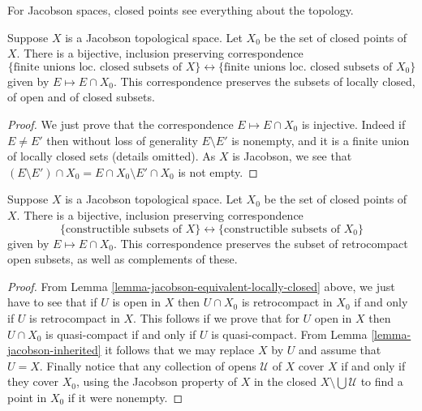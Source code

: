 \begin{lemma}
\label{lemma-jacobson-equivalent-locally-closed}
\begin{slogan}
For Jacobson spaces, closed points see everything about the topology.
\end{slogan}
Suppose $X$ is a Jacobson topological space.
Let $X_0$ be the set of closed points of $X$.
There is a bijective, inclusion preserving correspondence
$$
\{\text{finite unions loc.\ closed subsets of } X\}
\leftrightarrow
\{\text{finite unions loc.\ closed subsets of } X_0\}
$$
given by $E \mapsto E \cap X_0$. This correspondence preserves
the subsets of locally closed, of open and of closed subsets.
\end{lemma}

\begin{proof}
We just prove that the correspondence $E \mapsto E \cap X_0$ is injective.
Indeed if $E\neq E'$ then without loss of generality $E\setminus E'$ is
nonempty, and it is a finite union of locally closed sets (details omitted).
As $X$ is Jacobson, we see that
$(E \setminus E') \cap X_0 = E \cap X_0 \setminus E' \cap X_0$ is not empty.
\end{proof}

\begin{lemma}
\label{lemma-jacobson-equivalent-constructible}
Suppose $X$ is a Jacobson topological space.
Let $X_0$ be the set of closed points of $X$.
There is a bijective, inclusion preserving correspondence
$$
\{\text{constructible subsets of } X\}
\leftrightarrow
\{\text{constructible subsets of } X_0\}
$$
given by $E \mapsto E \cap X_0$. This correspondence preserves
the subset of retrocompact open subsets, as well as complements
of these.
\end{lemma}

\begin{proof}
From  Lemma \ref{lemma-jacobson-equivalent-locally-closed} above,
we just have to see that if $U$ is open in $X$ then $U\cap X_0$ is
retrocompact in $X_0$ if and only if $U$ is retrocompact in $X$.
This follows if we prove that for $U$ open in $X$ then $U\cap X_0$ is
quasi-compact if and only if $U$ is quasi-compact.
From  Lemma \ref{lemma-jacobson-inherited} it follows that we may replace
$X$ by $U$ and assume that $U = X$.
Finally notice that any collection of opens $\mathcal{U}$ of $X$ cover
$X$ if and only if they cover $X_0$, using the Jacobson property
of $X$ in the closed $X\setminus \bigcup \mathcal{U}$ to find a point
in $X_0$ if it were nonempty.
\end{proof}



















